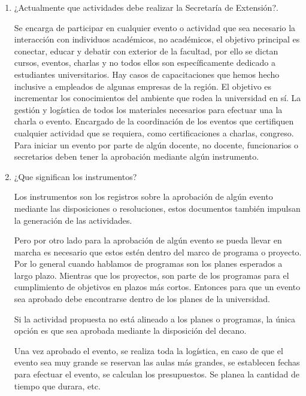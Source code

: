 \begin{enumerate}
    \item ¿Actualmente que actividades debe realizar la Secretaría de Extensión?.
    
    
    Se encarga de participar en cualquier evento o actividad que sea necesario la interacción con individuos académicos, no académicos, el objetivo 
    principal es conectar, educar y debatir con exterior de la facultad, por ello se dictan cursos, eventos, charlas y no todos ellos son específicamente dedicado a estudiantes universitarios.
    Hay casos de capacitaciones que hemos hecho inclusive a empleados de algunas empresas de la región.
    El objetivo es incrementar los conocimientos del ambiente que rodea la universidad en sí.
    La gestión y logística de todos los materiales necesarios para efectuar una la charla o evento.
    Encargado de la coordinación de los eventos que  certifiquen  cualquier actividad que se requiera, como certificaciones a charlas, congreso.
    Para iniciar un evento por parte de algún docente, no docente, funcionarios o secretarios deben tener la aprobación mediante algún instrumento.



    \item ¿Que significan los instrumentos?
    
    
    Los instrumentos son los registros sobre la aprobación
    de algún evento mediante las disposiciones o resoluciones, estos documentos
    también impulsan la generación de las actividades.

    Pero por otro lado para la aprobación de algún evento se 
    pueda llevar en marcha es necesario que estos estén dentro
    del marco de programa o proyecto. Por lo general cuando hablamos de programas son los planes 
    esperados a largo plazo. Mientras que los proyectos, 
    son parte de los programas para el cumplimiento de objetivos en
    plazos más cortos. 
    Entonces para que un evento sea aprobado debe encontrarse dentro de 
    los planes de la universidad. 

    Si la actividad propuesta no está alineado a los planes o programas,
    la única opción es que sea aprobada mediante la disposición del decano. 

    Una vez aprobado el evento, se realiza toda la logística, 
    en caso de que el evento sea muy grande se reservan las 
    aulas más grandes, se establecen fechas para efectuar el evento,
    se calculan los presupuestos.
    Se planea la cantidad de tiempo que durara, etc.


\end{enumerate}
